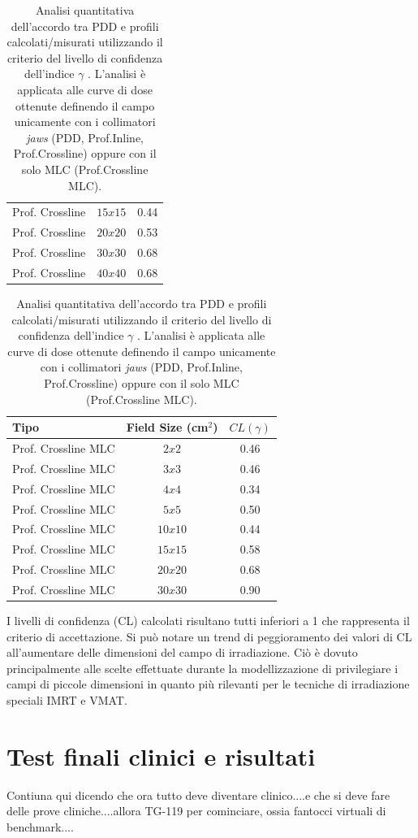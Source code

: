 \begin{table}
\begin{tabular}{lcc}
Prof. Crossline & $15x15$ & 0.44\\
Prof. Crossline & $20x20$ & 0.53\\
Prof. Crossline & $30x30$ & 0.68\\
Prof. Crossline & $40x40$ & 0.68\\
\bottomrule
\end{tabular}
\begin{tabular}{lcc}
\toprule
Tipo & Field Size (cm$^2$) & $CL(\gamma)$\\
\midrule
Prof. Crossline MLC & $2x2$ & 0.46\\
Prof. Crossline MLC & $3x3$ & 0.46\\
Prof. Crossline MLC & $4x4$ & 0.34\\
Prof. Crossline MLC & $5x5$ & 0.50\\
Prof. Crossline MLC & $10x10$ & 0.44\\
Prof. Crossline MLC & $15x15$ & 0.58\\
Prof. Crossline MLC & $20x20$ & 0.68\\
Prof. Crossline MLC & $30x30$ & 0.90\\
\bottomrule
\end{tabular}
\caption{Analisi quantitativa dell'accordo tra PDD e profili calcolati/misurati utilizzando il criterio del livello di confidenza dell'indice $\gamma$ \cite{Mijnheer2004,Ezzell2009}. L'analisi è applicata alle curve di dose ottenute definendo il campo unicamente con i collimatori \textit{jaws} (PDD, Prof.Inline, Prof.Crossline) oppure con il solo MLC (Prof.Crossline MLC).}
\label{tab:Ray_ALL_meas_calc}
\end{table}

I livelli di confidenza (CL) calcolati risultano tutti inferiori a 1 che rappresenta il criterio di accettazione. Si può notare un trend di peggioramento dei valori di CL all'aumentare delle dimensioni del campo di irradiazione. Ciò è dovuto principalmente alle scelte effettuate durante la modellizzazione di privilegiare i campi di piccole dimensioni in quanto più rilevanti per le tecniche di irradiazione speciali IMRT e VMAT.





\section{Test finali clinici e risultati}
Contiuna qui dicendo che ora tutto deve diventare clinico....e che si deve fare delle prove cliniche....allora TG-119 per cominciare, ossia fantocci virtuali di benchmark....

